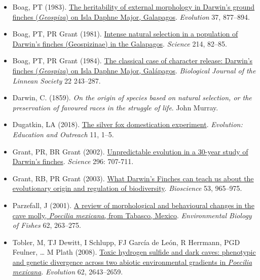 \documentclass[
]{book}
\providecommand{\tightlist}{%
  \setlength{\itemsep}{0pt}\setlength{\parskip}{0pt}}
\begin{document}
\begin{itemize}
\tightlist
\item
  Boag, PT (1983). \href{https://onlinelibrary.wiley.com/doi/10.1111/j.1558-5646.1983.tb05618.x}{The heritability of external morphology in Darwin's ground finches (\emph{Geospiza}) on Isla Daphne Major, Galapagos}. \emph{Evolution} 37, 877--894.
\item
  Boag, PT, PR Grant (1981). \href{https://science.sciencemag.org/content/214/4516/82}{Intense natural selection in a population of Darwin's finches (Geospizinae) in the Galapagos}. \emph{Science} 214, 82--85.
\item
  Boag, PT, PR Grant (1984). \href{https://academic.oup.com/biolinnean/article-abstract/22/3/243/2666306}{The classical case of character release: Darwin's finches (\emph{Geospiza}) on Isla Daphne Major, Galápagos}. \emph{Biological Journal of the Linnean Society} 22 243--287.
\item
  Darwin, C. (1859). \emph{On the origin of species based on natural selection, or the preservation of favoured races in the struggle of life}. John Murray.
\item
  Dugatkin, LA (2018). \href{https://evolution-outreach.biomedcentral.com/articles/10.1186/s12052-018-0090-x}{The silver fox domestication experiment}. \emph{Evolution: Education and Outreach} 11, 1--5.
\item
  Grant, PR, BR Grant (2002). \href{https://science.sciencemag.org/content/296/5568/707}{Unpredictable evolution in a 30-year study of Darwin's finches}. \emph{Science} 296: 707-711.
\item
  Grant, RB, PR Grant (2003). \href{https://academic.oup.com/bioscience/article/53/10/965/254944}{What Darwin's Finches can teach us about the evolutionary origin and regulation of biodiversity}. \emph{Bioscience} 53, 965--975.
\item
  Parzefall, J (2001). \href{https://link.springer.com/article/10.1023/A:1011899817764}{A review of morphological and behavioural changes in the cave molly, \emph{Poecilia mexicana}, from Tabasco, Mexico}. \emph{Environmental Biology of Fishes} 62, 263--275.
\item
  Tobler, M, TJ Dewitt, I Schlupp, FJ García de León, R Herrmann, PGD Feulner, \ldots{} M Plath (2008). \href{https://onlinelibrary.wiley.com/doi/full/10.1111/j.1558-5646.2008.00466.x}{Toxic hydrogen sulfide and dark caves: phenotypic and genetic divergence across two abiotic environmental gradients in \emph{Poecilia mexicana}}. \emph{Evolution} 62, 2643--2659.
\end{itemize}
\end{document}
